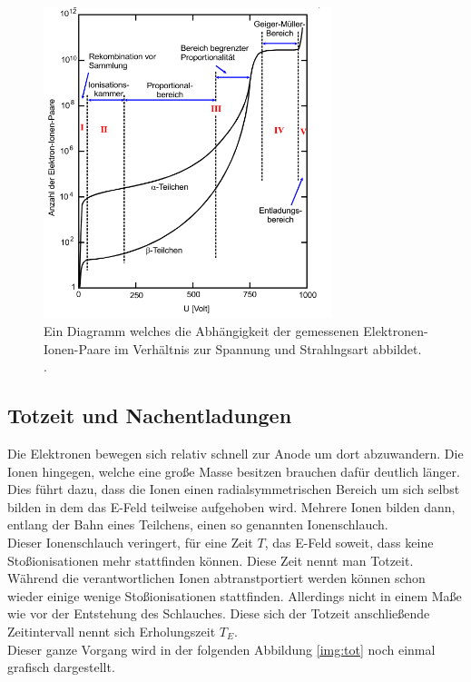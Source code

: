 \begin{figure}[H]
    \centering
    \includegraphics[width=0.75\textwidth]{images/Spannungsgrafik.PNG}
    \caption{Ein Diagramm welches die Abhängigkeit der gemessenen Elektronen-Ionen-Paare im Verhältnis zur Spannung und Strahlngsart abbildet. \protect \cite{V703}.}
    \label{img:spannung}
\end{figure}


\subsection{Totzeit und Nachentladungen}


\noindent
Die Elektronen bewegen sich relativ schnell zur Anode um dort abzuwandern. Die Ionen hingegen, welche eine große Masse besitzen brauchen dafür deutlich länger.
Dies führt dazu, dass die Ionen einen radialsymmetrischen Bereich um sich selbst bilden in dem das E-Feld teilweise aufgehoben wird. Mehrere Ionen bilden dann, entlang der Bahn eines Teilchens, einen so genannten Ionenschlauch.\\
Dieser Ionenschlauch veringert, für eine Zeit $T$, das E-Feld soweit, dass keine Stoßionisationen mehr stattfinden können. Diese Zeit nennt man Totzeit.\\
Während die verantwortlichen Ionen abtranstportiert werden können schon wieder einige wenige Stoßionisationen stattfinden. 
Allerdings nicht in einem Maße wie vor der Entstehung des Schlauches. Diese sich der Totzeit anschließende Zeitintervall nennt sich Erholungszeit $T_E$.\\
Dieser ganze Vorgang wird in der folgenden Abbildung \ref{img:tot} noch einmal grafisch dargestellt.

